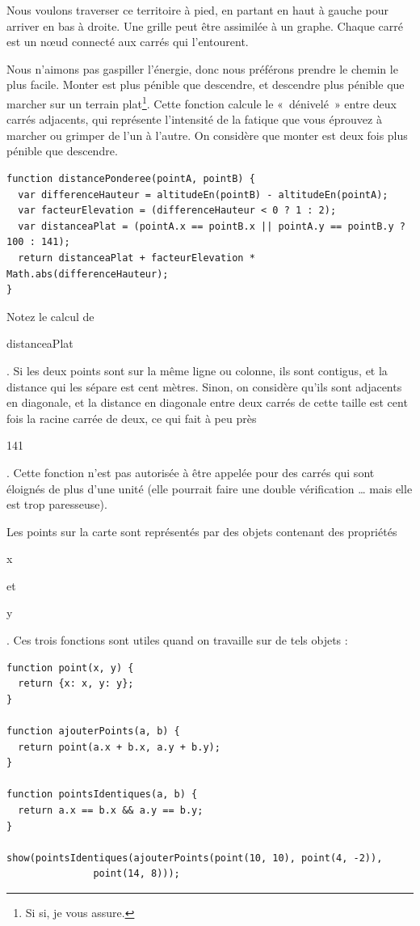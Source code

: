 \documentclass{FramateX}
\renewcommand{\texttt}[1]{\begin{sffamily}{#1}\end{sffamily}}
\begin{document}
Nous voulons traverser ce territoire à pied, en partant en haut à gauche
pour arriver en bas à droite. Une grille peut être assimilée à un
graphe. Chaque carré est un nœud connecté aux carrés qui l'entourent.

Nous n'aimons pas gaspiller l'énergie, donc nous préférons prendre le
chemin le plus facile. Monter est plus pénible que descendre, et
descendre plus pénible que marcher sur un terrain
plat\footnote{Si si, je vous assure.}. Cette fonction calcule le «~dénivelé~» entre
deux carrés adjacents, qui représente l'intensité de la fatique que vous
éprouvez à marcher ou grimper de l'un à l'autre. On considère que monter
est deux fois plus pénible que descendre.

\begin{lstlisting}
function distancePonderee(pointA, pointB) {
  var differenceHauteur = altitudeEn(pointB) - altitudeEn(pointA);
  var facteurElevation = (differenceHauteur < 0 ? 1 : 2);
  var distanceaPlat = (pointA.x == pointB.x || pointA.y == pointB.y ? 100 : 141);
  return distanceaPlat + facteurElevation * Math.abs(differenceHauteur);
}
\end{lstlisting}
Notez le calcul de \texttt{distanceaPlat}. Si les deux points sont sur
la même ligne ou colonne, ils sont contigus, et la distance qui les
sépare est cent mètres. Sinon, on considère qu'ils sont adjacents en
diagonale, et la distance en diagonale entre deux carrés de cette taille
est cent fois la racine carrée de deux, ce qui fait à peu près
\texttt{141}. Cette fonction n'est pas autorisée à être appelée pour des
carrés qui sont éloignés de plus d'une unité (elle pourrait faire une
double vérification \ldots{} mais elle est trop paresseuse).

\begin{center}\end{center}

Les points sur la carte sont représentés par des objets contenant des
propriétés \texttt{x} et \texttt{y}. Ces trois fonctions sont utiles
quand on travaille sur de tels objets :

\begin{lstlisting}
function point(x, y) {
  return {x: x, y: y};
}

function ajouterPoints(a, b) {
  return point(a.x + b.x, a.y + b.y);
}

function pointsIdentiques(a, b) {
  return a.x == b.x && a.y == b.y;
}

show(pointsIdentiques(ajouterPoints(point(10, 10), point(4, -2)),
               point(14, 8)));
\end{lstlisting}
\begin{center}\end{center}
\end{document}
